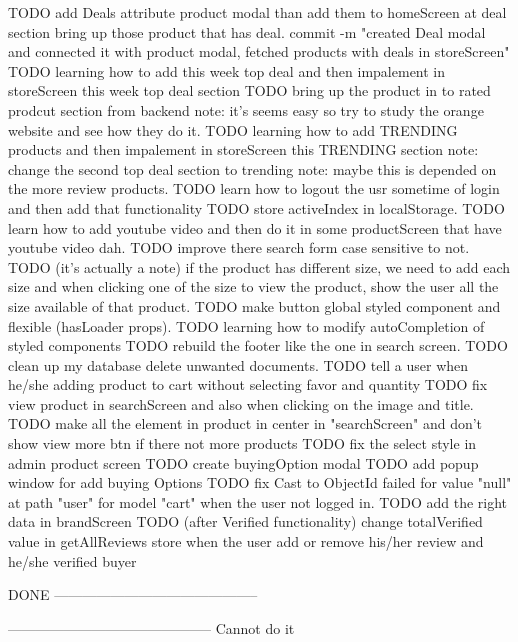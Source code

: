 TODO add Deals attribute product modal than add them to homeScreen 
       at deal section bring up those product that has deal.
       commit -m "created Deal modal and connected it with product modal, fetched products with deals in 
       storeScreen"
TODO   learning how to add this week top deal and then impalement in storeScreen this week top deal section
TODO   bring up the product in to rated prodcut section from backend 
      note: it's seems easy so try to study the orange website and see how they do it.
TODO   learning how to add TRENDING products and then impalement in storeScreen this TRENDING section
      note: change the second top deal section to trending 
      note: maybe this is depended on the more review products.
TODO   learn how to logout the usr sometime of login and then add that functionality
TODO   store activeIndex in localStorage.
TODO   learn how to add youtube video and then do it in some productScreen that have youtube video dah.
TODO   improve there search form case sensitive to not.
TODO   (it's actually a note) if the product has different size, we need to add each size and when
          clicking one of the size to view the product, show the user all the size available of that product.
TODO   make button global styled component and flexible (hasLoader props).
TODO   learning how to modify autoCompletion of styled components 
TODO   rebuild the footer like the one in search screen.
TODO   clean up my database delete unwanted documents.
TODO   tell a user when he/she adding product to cart without selecting favor and quantity
TODO   fix view product in searchScreen and also when clicking on the image and title.
TODO   make all the element in product in center in "searchScreen" and don't show view more btn if there not more products
TODO   fix the select style in admin product screen
TODO   create buyingOption modal 
TODO   add popup window for add buying Options
TODO   fix Cast to ObjectId failed for value "null" at path "user" for model "cart" when the user not logged in.
TODO   add the right data in brandScreen 
TODO   (after Verified functionality) change totalVerified value in getAllReviews store when the user add or remove his/her review and he/she verified buyer

DONE
--------------------------------------------



--------------------------------------------
Cannot do it

